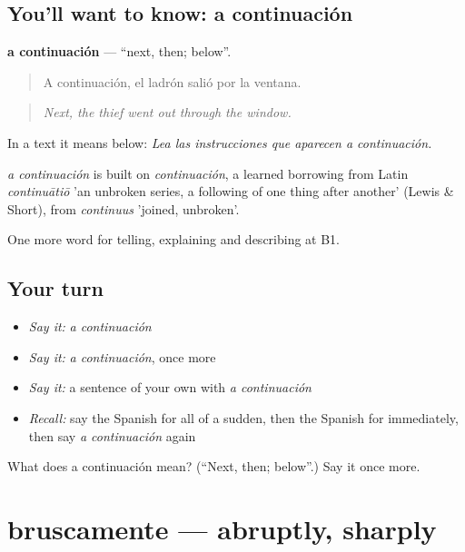 \subsection*{You'll want to know: a continuación}
\textbf{a continuación} — \textquotedblleft{}next, then; below\textquotedblright{}.

\begin{quote}
A continuación, el ladrón salió por la ventana.
\end{quote}

\begin{quote}
\emph{Next, the thief went out through the window.}
\end{quote}

In a text it means below: \emph{Lea las instrucciones que aparecen a continuación.}

\begin{cousinweb}
\emph{a continuación} is built on \emph{continuación}, a learned borrowing from Latin \emph{continuātiō} 'an unbroken series, a following of one thing after another' (Lewis \& Short), from \emph{continuus} 'joined, unbroken'.
\end{cousinweb}

\begin{grammarlens}[title={What you've built}]
One more word for telling, explaining and describing at B1.
\end{grammarlens}

\subsection*{Your turn}
\begin{itemize}
\raggedright
  \item \emph{Say it:} \emph{a continuación}
  \item \emph{Say it:} \emph{a continuación}, once more
  \item \emph{Say it:} a sentence of your own with \emph{a continuación}
  \item \emph{Recall:} say the Spanish for all of a sudden, then the Spanish for immediately, then say \emph{a continuación} again
\end{itemize}

\begin{tcolorbox}[breakable,colback=teal!4,colframe=teal!35!black,title={Before you move on}]
What does a continuación mean? (\textquotedblleft{}Next, then; below\textquotedblright{}.) Say it once more.
\end{tcolorbox}
\section[bruscamente]{bruscamente — abruptly, sharply}

